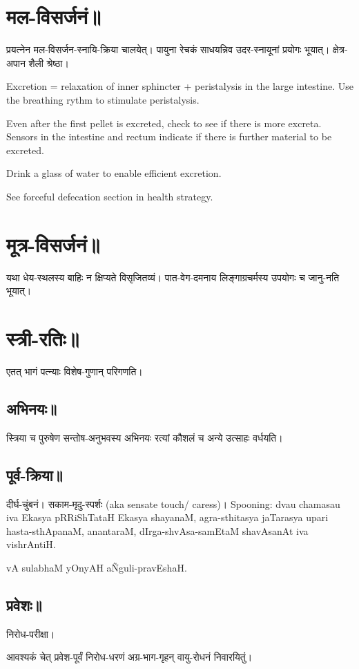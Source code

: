 \documentclass[oneside, article]{memoir}
\begin{document}
\chapter{मल-विसर्जनं॥}
प्रयत्नेन मल-विसर्जन-स्नायि-क्रिया चालयेत्। पायुना रेचकं साधयन्निव उदर-स्नायूनां‌ प्रयोगः भूयात्। क्षेत्र-अपान शैली श्रेष्ठा।

Excretion = relaxation of inner sphincter + peristalysis in the large intestine. Use the breathing rythm to stimulate peristalysis.

Even after the first pellet is excreted, check to see if there is more excreta. Sensors in the intestine and rectum indicate if there is further material to be excreted.

Drink a  glass of water to enable efficient excretion.

See forceful defecation section in health strategy.

\chapter{मूत्र-विसर्जनं॥}
यथा धेय-स्थलस्य बाहिः न क्षिप्यते विसृजितव्यं। पात-वेग-दमनाय लिङ्गाग्रचर्मस्य उपयोगः च जानु-नति भूयात्।

\chapter{स्त्री-रतिः॥}
एतत् भागं पत्न्याः विशेष-गुणान् परिगणति।

\section{अभिनयः॥}
स्त्रिया च पुरुषेण सन्तोष-अनुभवस्य अभिनयः रत्यां कौशलं च अन्ये उत्साहः वर्धयति।

\section{पूर्व-क्रिया॥}
दीर्घ-चुंबनं। सकाम-मृदु-स्पर्शः (aka sensate touch/ caress)। Spooning: dvau chamasau iva Ekasya pRRiShTataH Ekasya shayanaM, agra-sthitasya jaTarasya upari hasta-sthApanaM, anantaraM, dIrga-shvAsa-samEtaM shavAsanAt iva vishrAntiH.

vA sulabhaM yOnyAH a\~Nguli-pravEshaH.

\section{प्रवेशः॥}
निरोध-परीक्षा।

आवश्यकं चेत् प्रवेश-पूर्वं निरोध-धरणं अग्र-भाग-गृहन् वायु-रोधनं निवारयितुं।
\end{document}
